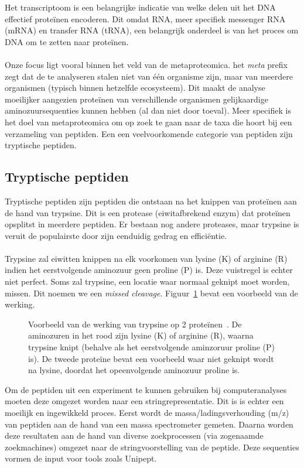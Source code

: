 Het transcriptoom is een belangrijke indicatie van welke delen uit het DNA effectief proteïnen encoderen.
Dit omdat RNA, meer specifiek messenger RNA (mRNA) en transfer RNA (tRNA), een belangrijk onderdeel is van het proces om DNA om te zetten naar proteïnen.
\\ \\
Onze focus ligt vooral binnen het veld van de metaproteomica.
het \textit{meta} prefix zegt dat de te analyseren stalen niet van één organisme zijn, maar van meerdere organismen (typisch binnen hetzelfde ecosysteem).
Dit maakt de analyse moeilijker aangezien proteïnen van verschillende organismen gelijkaardige aminozuursequenties kunnen hebben (al dan niet door toeval).
Meer specifiek is het doel van metaproteomica om op zoek te gaan naar de taxa die hoort bij een verzameling van peptiden.
Een een veelvoorkomende categorie van peptiden zijn tryptische peptiden.

\subsection{Tryptische peptiden}\label{subsec:tryptische-peptiden}
Tryptische peptiden zijn peptiden die ontstaan na het knippen van proteïnen aan de hand van trypsine.
Dit is een protease (eiwitafbrekend enzym) dat proteïnen opsplitst in meerdere peptiden.
Er bestaan nog andere proteases, maar trypsine is veruit de populairste door zijn eenduidig gedrag en efficiëntie.
\\ \\
Trypsine zal eiwitten knippen na elk voorkomen van lysine (K) of arginine (R) indien het eerstvolgende aminozuur geen proline (P) is.
Deze vuistregel is echter niet perfect.
Soms zal trypsine, een locatie waar normaal geknipt moet worden, missen.
Dit noemen we een \textit{missed cleavage}.
Figuur~\ref{fig:trypsine} bevat een voorbeeld van de werking.

\begin{figure}[H]
    \centering
    
    \caption{Voorbeeld van de werking van trypsine op 2 proteïnen~\cite{phdPieterUnipept}. De aminozuren in het rood zijn lysine (K) of arginine (R), waarna trypsine knipt (behalve als het eerstvolgende aminzoruur proline (P) is). De tweede proteïne bevat een voorbeeld waar niet geknipt wordt na lysine, doordat het opeenvolgende aminozuur proline is.}
    \label{fig:trypsine}
\end{figure}

Om de peptiden uit een experiment te kunnen gebruiken bij computeranalyses moeten deze omgezet worden naar een stringrepresentatie.
Dit is is echter een moeilijk en ingewikkeld proces.
Eerst wordt de massa/ladingsverhouding (m/z) van peptiden aan de hand van een massa spectrometer gemeten.
Daarna worden deze resultaten aan de hand van diverse zoekprocessen (via zogenaamde zoekmachines) omgezet naar de stringvoorstelling van de peptide.
Deze sequenties vormen de input voor tools zoals Unipept.

